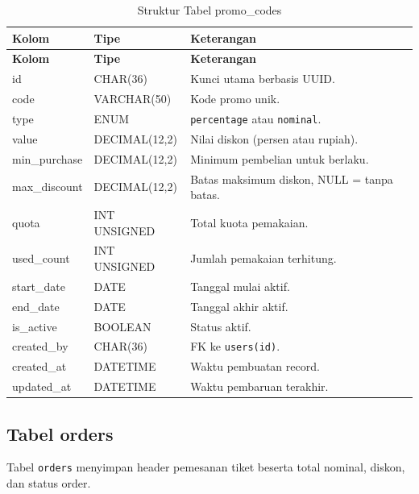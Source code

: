 \documentclass[12pt,a4paper]{report}
\begin{document}
\begin{longtable}{p{3.6cm} p{3.6cm} p{8.5cm}}
\caption{Struktur Tabel promo\_codes} \label{tab:promo-codes} \\
\toprule
\textbf{Kolom} & \textbf{Tipe} & \textbf{Keterangan} \\
\midrule
\endfirsthead
\toprule
\textbf{Kolom} & \textbf{Tipe} & \textbf{Keterangan} \\
\midrule
\endhead
\bottomrule
\endfoot
id            & CHAR(36)      & Kunci utama berbasis UUID. \\
code          & VARCHAR(50)   & Kode promo unik. \\
type          & ENUM          & \texttt{percentage} atau \texttt{nominal}. \\
value         & DECIMAL(12,2) & Nilai diskon (persen atau rupiah). \\
min\_purchase & DECIMAL(12,2) & Minimum pembelian untuk berlaku. \\
max\_discount & DECIMAL(12,2) & Batas maksimum diskon, NULL = tanpa batas. \\
quota         & INT UNSIGNED  & Total kuota pemakaian. \\
used\_count   & INT UNSIGNED  & Jumlah pemakaian terhitung. \\
start\_date   & DATE          & Tanggal mulai aktif. \\
end\_date     & DATE          & Tanggal akhir aktif. \\
is\_active    & BOOLEAN       & Status aktif. \\
created\_by   & CHAR(36)      & FK ke \texttt{users(id)}. \\
created\_at   & DATETIME      & Waktu pembuatan record. \\
updated\_at   & DATETIME      & Waktu pembaruan terakhir. \\
\end{longtable}

\subsection{Tabel orders}
Tabel \texttt{orders} menyimpan header pemesanan tiket beserta total nominal, diskon, dan status order.
\end{document}
